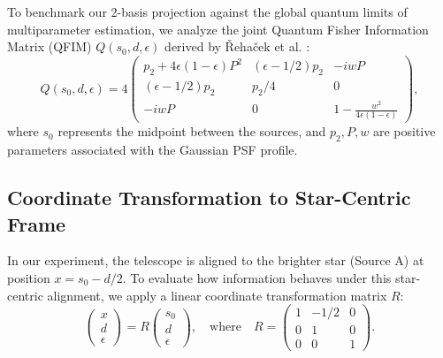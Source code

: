 To benchmark our 2-basis projection against the global quantum limits of multiparameter estimation, we analyze the joint Quantum Fisher Information Matrix (QFIM) $Q(s_0, d, \epsilon)$ derived by \v{R}eha\v{c}ek et al. \cite{Rehacek2017multiparameter}:
\begin{equation}
    Q(s_0, d, \epsilon) = 4 \begin{pmatrix}
        p_2 + 4\epsilon(1-\epsilon)P^2 & (\epsilon - 1/2)p_2 & -iwP                                   \\
        (\epsilon - 1/2)p_2            & p_2/4               & 0                                      \\
        -iwP                           & 0                   & 1 - \frac{w^2}{4 \epsilon(1-\epsilon)}
    \end{pmatrix},
    \label{eq:qfim_rehacek_link}
\end{equation}
where $s_0$ represents the midpoint between the sources, and $p_2, P, w$ are positive parameters associated with the Gaussian PSF profile.

\subsection{Coordinate Transformation to Star-Centric Frame}
In our experiment, the telescope is aligned to the brighter star (Source A) at position $x = s_0 - d/2$. To evaluate how information behaves under this star-centric alignment, we apply a linear coordinate transformation matrix $R$:
\begin{equation}
    \begin{pmatrix} x \\ d \\ \epsilon \end{pmatrix} = R \begin{pmatrix} s_0 \\ d \\ \epsilon \end{pmatrix}, \quad \text{where} \quad R = \begin{pmatrix} 1 & -1/2 & 0 \\ 0 & 1 & 0 \\ 0 & 0 & 1 \end{pmatrix}.
    \label{eq:coord_map_link}
\end{equation}

